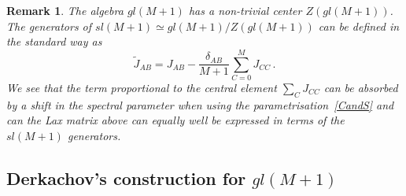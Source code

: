 \documentclass[11pt]{article}
\numberwithin{equation}{section}
\newtheorem{remark}[theorem]{Remark}
\begin{document}
\begin{remark}
The algebra $gl(M+1)$ has a non-trivial center $Z(gl(M+1))$. The generators of $sl(M+1)\simeq gl(M+1)/Z(gl(M+1))$
can be defined in the standard way \cite{Humphreys1972} as
\begin{equation}
 \tilde J_{AB}=J_{AB}-\frac{\delta_{AB}}{M+1}\sum_{C=0}^{M}J_{CC}\,.
\end{equation}
We see that the term proportional to the central element $\sum_{C}J_{CC}$  can be absorbed by a shift in the spectral parameter when using the parametrisation~\eqref{CandS} and can the Lax matrix above can equally well be expressed in terms of the $sl(M+1)$ generators.
\end{remark}






	\subsection{Derkachov's construction for $gl(M+1)$}
\end{document}
